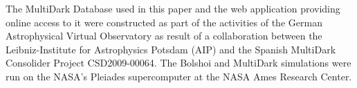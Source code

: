 \documentclass{emulateapj}
\begin{document}
The MultiDark Database used in this paper and the web application providing online access to it were constructed as part of the
activities of the German Astrophysical Virtual Observatory as result
of a collaboration between the Leibniz-Institute for Astrophysics
Potsdam (AIP) and the Spanish MultiDark Consolider Project
CSD2009-00064. The Bolshoi and MultiDark simulations were run on the
NASA's Pleiades supercomputer at the NASA Ames Research Center.





\end{document}
